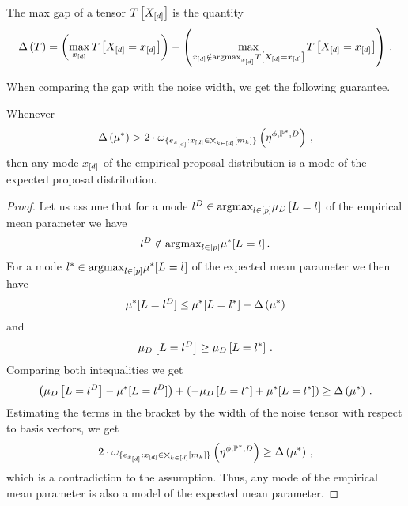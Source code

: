 \begin{definition}
    The max gap of a tensor $T\left[X_{[d]}\right]$ is the quantity
    \begin{align*}
        \Delta\left(T\right) =
        \left(\max_{x_{[d]}} T\left[X_{[d]}=x_{[d]}\right]\right) -
        \left(\max_{x_{[d]}\notin\mathrm{argmax}_{x_{[d]}}T\left[X_{[d]}=x_{[d]}\right]}
        T\left[X_{[d]}=x_{[d]}\right]\right) \, .
    \end{align*}
\end{definition}

When comparing the gap with the noise width, we get the following guarantee.

\begin{theorem}
    \label{the:detGuaranteeProposalDist}
    Whenever
    \begin{align*}
        \Delta\left(\mu^*\right)
        > 2 \cdot \omega_{\{e_{x_{[d]}}:x_{[d]}\in\bigtimes_{k\in[d]}[m_{k}]\}}\left(\eta^{\phi,\mathbb{P}^*,D}\right) \, ,
    \end{align*}
    then any mode $x_{[d]}$ of the empirical proposal distribution is a mode of the expected proposal distribution.
\end{theorem}
\begin{proof}
    Let us assume that for a mode $l^{D}\in\mathrm{argmax}_{l\in[p]}\mu_{D}\left[L_{}=l_{}\right]$ of the empirical mean parameter we have
    \begin{align*}
        l^{D}\notin\mathrm{argmax}_{l\in[p]}\mu^*[L_{}=l_{}] \, .
    \end{align*}
    For a mode $l^{*}\in\mathrm{argmax}_{l\in[p]}\mu^*[L_{}=l_{}]$ of the expected mean parameter we then have
    \begin{align*}
        \mu^*[L=l^{D}] \leq \mu^*[L=l^{*}] - \Delta\left(\mu^*\right)
    \end{align*}
    and
    \begin{align*}
        \mu_{D}\left[L=l^{D}\right] \geq \mu_{D}\left[L=l^{*}\right] \, .
    \end{align*}
    Comparing both intequalities we get
    \begin{align*}
        \left(\mu_{D}\left[L=l^{D}\right] - \mu^*[L=l^{D}]\right)
        + \left( - \mu_{D}\left[L=l^{*}\right] + \mu^*[L=l^{*}] \right)
        \geq \Delta\left(\mu^*\right) \, .
    \end{align*}
    Estimating the terms in the bracket by the width of the noise tensor with respect to basis vectors, we get
    \begin{align*}
        2 \cdot  \omega_{\{e_{x_{[d]}}:x_{[d]}\in\bigtimes_{k\in[d]}[m_{k}]\}}\left(\eta^{\phi,\mathbb{P}^*,D}\right)
        \geq \Delta\left(\mu^*\right) \, ,
    \end{align*}
    which is a contradiction to the assumption.
    Thus, any mode of the empirical mean parameter is also a model of the expected mean parameter.
\end{proof}


